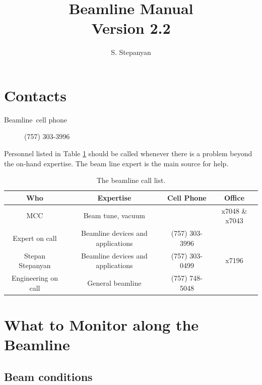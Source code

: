 \documentclass[12pt]{article}
\newcommand{\versionnumber}{2.2}
\begin{document}
\title{Beamline Manual\\\normalsize Version \versionnumber}
\author{S. Stepanyan}
\maketitle



\section{Contacts\label{beamline_contacts}}

\begin{description}
\item [Beamline~cell phone] (757) 303-3996
\end{description}

Personnel listed in Table \ref{tab:calllist} should be called whenever there
is a problem beyond the on-hand expertise. The beam line expert is the main source for help.  
\begin{table}[tbhp]
\vspace{0.3cm}
{\centering \begin{tabular}{|c|c|c|c|}
\hline 
Who&Expertise&Cell Phone&Office\\
\hline 
\hline 
MCC&Beam tune, vacuum&&x7048 \& x7043\\
\hline 
Expert on call&Beamline devices and applications&(757) 303-3996&\\
\hline 
Stepan Stepanyan&Beamline devices and applications&(757) 303-0499&x7196\\
\hline 
Engineering on call&General beamline&(757) 748-5048&\\
\hline 
\end{tabular}\par}
\vspace{0.3cm}


\caption{The beamline call list.\label{tab:calllist}}
\end{table} 



\section{What to Monitor along the Beamline}


\subsection{Beam conditions}
\indent
\end{document}
